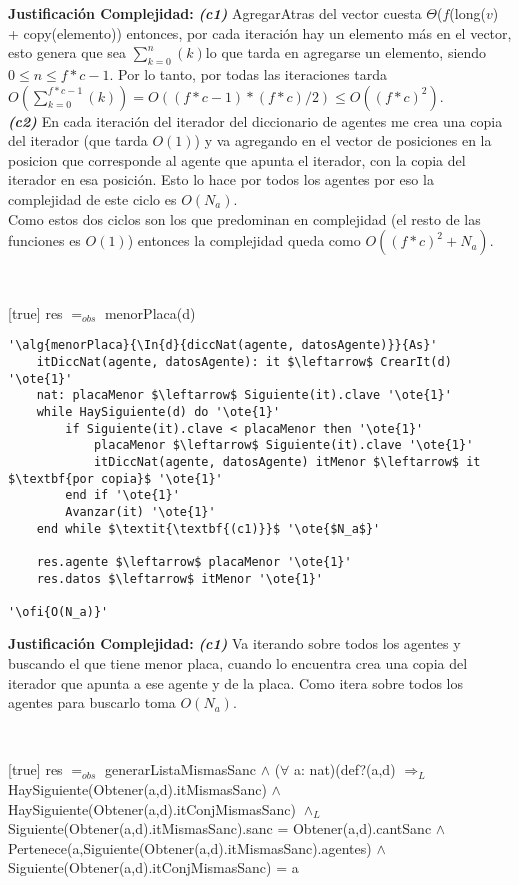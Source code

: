 \textbf{Justificación Complejidad:} \textit{\textbf{(c1)}} AgregarAtras del vector cuesta $\Theta$($f$(long($v$) + copy(elemento)) entonces, por cada iteración hay un elemento más en el vector, esto genera que sea $\sum_{k=0}^{n}(k)$lo que tarda en agregarse un elemento, siendo $0\leq n \leq f*c-1$. Por lo tanto, por todas las iteraciones tarda $O(\sum_{k=0}^{f*c - 1}(k)) = O((f*c-1)*(f*c)/2) \leq O((f*c)^2)$. \\
\textit{\textbf{(c2)}} En cada iteración del iterador del diccionario de agentes me crea una copia del iterador (que tarda $O(1)$) y va agregando en el vector de posiciones en la posicion que corresponde al agente que apunta el iterador, con la copia del iterador en esa posición. Esto lo hace por todos los agentes por eso la complejidad de este ciclo es $O(N_a)$. \\
Como estos dos ciclos son los que predominan en complejidad (el resto de las funciones es $O(1)$) entonces la complejidad queda como $O((f*c)^2 + N_a)$.


~

[true]
{res $=_{obs}$ menorPlaca(d)}

\begin{lstlisting}[mathescape]
'\alg{menorPlaca}{\In{d}{diccNat(agente, datosAgente)}}{As}'
	itDiccNat(agente, datosAgente): it $\leftarrow$ CrearIt(d) '\ote{1}'
	nat: placaMenor $\leftarrow$ Siguiente(it).clave '\ote{1}'
	while HaySiguiente(d) do '\ote{1}'
		if Siguiente(it).clave < placaMenor	then '\ote{1}'
			placaMenor $\leftarrow$ Siguiente(it).clave '\ote{1}'
			itDiccNat(agente, datosAgente) itMenor $\leftarrow$ it $\textbf{por copia}$ '\ote{1}'
		end if '\ote{1}'
		Avanzar(it) '\ote{1}'
	end while $\textit{\textbf{(c1)}}$ '\ote{$N_a$}'

	res.agente $\leftarrow$ placaMenor '\ote{1}'
	res.datos $\leftarrow$ itMenor '\ote{1}'

'\ofi{O(N_a)}'
\end{lstlisting}

\textbf{Justificación Complejidad:} \textit{\textbf{(c1)}} Va iterando sobre todos los agentes y buscando el que tiene menor placa, cuando lo encuentra crea una copia del iterador que apunta a ese agente y de la placa. Como itera sobre todos los agentes para buscarlo toma $O(N_a)$.

~


[true]
{res $=_{obs}$ generarListaMismasSanc $\land$ ($\forall$ a: nat)(def?(a,d) $\Rightarrow_L$ HaySiguiente(Obtener(a,d).itMismasSanc) $\land$ HaySiguiente(Obtener(a,d).itConjMismasSanc) $\land_L$ Siguiente(Obtener(a,d).itMismasSanc).sanc = Obtener(a,d).cantSanc $\land$ Pertenece(a,Siguiente(Obtener(a,d).itMismasSanc).agentes) $\land$ Siguiente(Obtener(a,d).itConjMismasSanc) = a}


